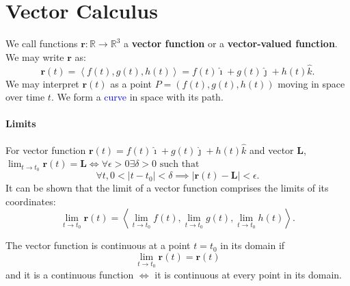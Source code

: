 \section{Vector Calculus}
We call functions $\mathbf{r}: \mathbb{R}\to\mathbb{R}^{3}$ a \textbf{vector
function} or a \textbf{vector-valued function}.
We may write $\mathbf{r}$ as:
\[\mathbf{r}\left( t \right) =\left<f\left( t \right) ,g\left( t \right)
,h\left( t \right)  \right> =f\left( t \right) \mathbf{\hat{\imath}}+g\left( t
\right) \mathbf{\hat{\jmath}}+h\left( t \right) \hat{k}.\] 
We may interpret $\mathbf{r}\left( t \right) $ as a point $P=\left( f\left( t
\right) ,g\left( t \right) ,h\left( t \right)  \right) $ moving in space over
time $t$. We form a \textcolor{Blue}{curve} in space with its path.

\paragraph{Limits}
For vector function $\mathbf{r}\left( t \right) =f\left( t \right)
\hat{\imath}+g\left( t \right) \hat{\jmath}+h\left( t \right) \hat{k}$ and
vector $\mathbf{L}$, $\lim_{t \to t_0} \mathbf{r}\left( t \right)
=\mathbf{L}\iff\forall \epsilon>0\exists\delta>0\text{ such that }$
\[\forall t, 0<\left| t-t_0 \right| <\delta \implies\left| \mathbf{r}\left( t \right) -\mathbf{L} \right| <\epsilon.\] 
It can be shown that the limit of a vector function comprises the limits of its
coordinates:
\[\lim_{t \to t_0} \mathbf{r}\left( t \right) =\left<\lim_{t \to t_0} f\left( t \right) ,\lim_{t \to t_0} g\left( t \right) ,\lim_{t \to t_0} h\left( t \right)  \right>.\] 

The vector function is \textcolor{Bittersweet}{continuous at a point $t=t_0$}
in its domain if
\[\lim_{t \to t_0} \mathbf{r}\left( t \right) =\mathbf{r}\left( t \right)\] 
and it is a \textcolor{Bittersweet}{continuous function} $\iff$ it is
continuous at every point in its domain.

